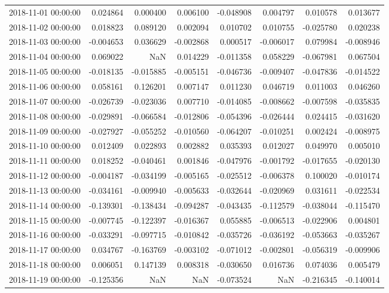 \begin{tabular}{lrrrrrrr}
2018-11-01 00:00:00 & 0.024864 & 0.000400 & 0.006100 & -0.048908 & 0.004797 & 0.010578 & 0.013677 \\
2018-11-02 00:00:00 & 0.018823 & 0.089120 & 0.002094 & 0.010702 & 0.010755 & -0.025780 & 0.020238 \\
2018-11-03 00:00:00 & -0.004653 & 0.036629 & -0.002868 & 0.000517 & -0.006017 & 0.079984 & -0.008946 \\
2018-11-04 00:00:00 & 0.069022 & NaN & 0.014229 & -0.011358 & 0.058229 & -0.067981 & 0.067504 \\
2018-11-05 00:00:00 & -0.018135 & -0.015885 & -0.005151 & -0.046736 & -0.009407 & -0.047836 & -0.014522 \\
2018-11-06 00:00:00 & 0.058161 & 0.126201 & 0.007147 & 0.011230 & 0.046719 & 0.011003 & 0.046260 \\
2018-11-07 00:00:00 & -0.026739 & -0.023036 & 0.007710 & -0.014085 & -0.008662 & -0.007598 & -0.035835 \\
2018-11-08 00:00:00 & -0.029891 & -0.066584 & -0.012806 & -0.054396 & -0.026444 & 0.024415 & -0.031620 \\
2018-11-09 00:00:00 & -0.027927 & -0.055252 & -0.010560 & -0.064207 & -0.010251 & 0.002424 & -0.008975 \\
2018-11-10 00:00:00 & 0.012409 & 0.022893 & 0.002882 & 0.035393 & 0.012027 & 0.049970 & 0.005010 \\
2018-11-11 00:00:00 & 0.018252 & -0.040461 & 0.001846 & -0.047976 & -0.001792 & -0.017655 & -0.020130 \\
2018-11-12 00:00:00 & -0.004187 & -0.034199 & -0.005165 & -0.025512 & -0.006378 & 0.100020 & -0.010174 \\
2018-11-13 00:00:00 & -0.034161 & -0.009940 & -0.005633 & -0.032644 & -0.020969 & 0.031611 & -0.022534 \\
2018-11-14 00:00:00 & -0.139301 & -0.138434 & -0.094287 & -0.043435 & -0.112579 & -0.038044 & -0.115470 \\
2018-11-15 00:00:00 & -0.007745 & -0.122397 & -0.016367 & 0.055885 & -0.006513 & -0.022906 & 0.004801 \\
2018-11-16 00:00:00 & -0.033291 & -0.097715 & -0.010842 & -0.035726 & -0.036192 & -0.053663 & -0.035267 \\
2018-11-17 00:00:00 & 0.034767 & -0.163769 & -0.003102 & -0.071012 & -0.002801 & -0.056319 & -0.009906 \\
2018-11-18 00:00:00 & 0.006051 & 0.147139 & 0.008318 & -0.030650 & 0.016736 & 0.074036 & 0.005479 \\
2018-11-19 00:00:00 & -0.125356 & NaN & NaN & -0.073524 & NaN & -0.216345 & -0.140014 \\

\end{tabular}
